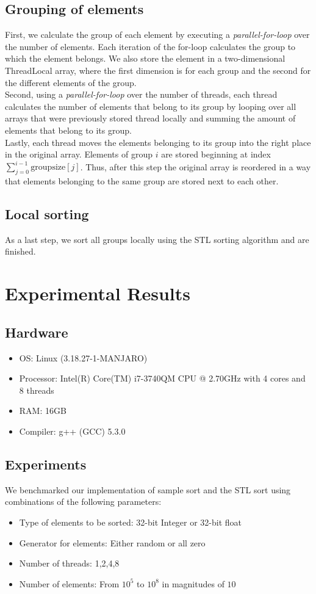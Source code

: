 \documentclass{llncs}
\begin{document}
\subsection{Grouping of elements}
First, we calculate the group of each element by executing a \emph{parallel-for-loop} over the number of elements. Each iteration of the for-loop calculates the group to which the element belongs. We also store the element in a two-dimensional ThreadLocal array, where the first dimension is for each group and the second for the different elements of the group. \\
Second, using a \emph{parallel-for-loop} over the number of threads, each thread calculates the number of elements that belong to its group by looping over all arrays that were previously stored thread locally and summing the amount of elements that belong to its group.  \\
Lastly, each thread moves the elements belonging to its group into the right place in the original array. Elements of group $i$ are stored beginning at index  $\sum_{j=0}^{i-1}\text{groupsize}[j]$. Thus, after this step the original array is reordered in a way that elements belonging to the same group are stored next to each other.
\subsection{Local sorting}
As a last step, we sort all groups locally using the STL sorting algorithm and are finished.
\section{Experimental Results}
\subsection{Hardware}
\begin{itemize}
	\item OS: Linux (3.18.27-1-MANJARO)
	\item Processor: Intel(R) Core(TM) i7-3740QM CPU @ 2.70GHz with 4 cores and 8 threads
	\item RAM: 16GB
	\item Compiler: g++ (GCC) 5.3.0
\end{itemize}

\subsection{Experiments}
We benchmarked our implementation of sample sort and the STL sort using combinations of the following parameters:
\begin{itemize}
	\item Type of elements to be sorted: 32-bit Integer or 32-bit float
	\item Generator for elements: Either random or all zero
	\item Number of threads: 1,2,4,8
	\item Number of elements: From $10^5$ to $10^8$ in magnitudes of $10$
\end{itemize}
\end{document}
